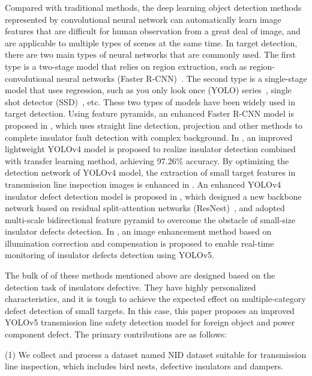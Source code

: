 \documentclass[sn-mathphys,Numbered]{sn-jnl}%
\theoremstyle{thmstyleone}%
\theoremstyle{thmstyletwo}%
\theoremstyle{thmstylethree}%
\begin{document}
Compared with traditional methods, the deep learning object detection methods represented by convolutional neural network can automatically learn image features that are difficult for human observation from a great deal of image, and are applicable to multiple types of scenes at the same time. In target detection, there are two main types of neural networks that are commonly used.  The first type is a two-stage model that relies on region extraction, such as region-convolutional neural networks (Faster R-CNN)~\cite{ren2015faster}. The second type is a single-stage model that uses regression, such as you only look once (YOLO) series~\cite{redmon2016you}, single shot detector (SSD)~\cite{liu2016ssd}, etc. These two types of models have been widely used in target detection. Using feature pyramids, an enhanced Faster R-CNN model is proposed in \cite{zhao2021insulator}, which uses straight line detection, projection and other methods to complete insulator fault detection with complex background. In \cite{qiu2022detection}, an improved lightweight YOLOv4 model is proposed to realize insulator detection combined with transfer learning method, achieving 97.26\% accuracy. By optimizing the detection network of YOLOv4 model, the extraction of small target features in transmission line inspection images is enhanced in \cite{liu2022key}. An enhanced YOLOv4 insulator defect detection model is proposed in \cite{hao2022insulator}, which designed a new backbone network based on residual split-attention networks (ResNest)~\cite{zhang2022resnest}, and adopted multi-scale bidirectional feature pyramid to overcome the obstacle of small-size insulator defects detection. In \cite{li2022insulator}, an image enhancement method based on illumination correction and compensation is proposed to enable real-time monitoring of insulator defects detection using YOLOv5. 

The bulk of of these methods mentioned above are designed based on the detection task of insulators defective. They have highly personalized characteristics, and it is tough to achieve the expected effect on multiple-category defect detection of small targets. In this case, this paper proposes an improved YOLOv5 transmission line safety detection model for foreign object and power component defect. The primary contributions are as follows:


(1) We collect and  process a dataset named NID dataset suitable for transmission line inspection, which includes bird nests, defective insulators and dampers.
\end{document}
